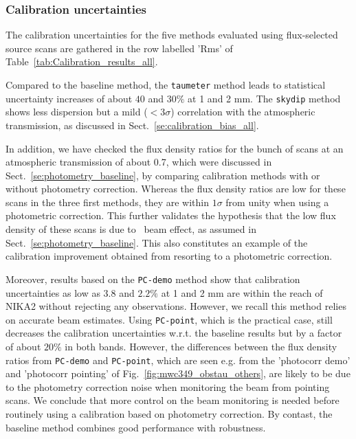 \subsubsection{Calibration uncertainties}

The calibration uncertainties for the five methods evaluated using
flux-selected source scans are gathered in the row labelled 'Rms'
of Table~\ref{tab:Calibration_results_all}.

Compared to the baseline method, the {\tt taumeter} method leads to 
statistical uncertainty increases of about $40$ and $30\%$ at 1 and 2
mm. The {\tt skydip} method shows less dispersion but a mild
($<3\sigma$) correlation with the atmospheric transmission, as
discussed in Sect.~\ref{se:calibration_bias_all}.

In addition, we have checked the flux density ratios for the bunch of
scans at an atmospheric transmission of about 0.7, which were
discussed in Sect.~\ref{se:photometry_baseline}, by comparing
calibration methods with or without photometry correction. Whereas the
flux density ratios are low for these scans in the three first
methods, they are within $1\sigma$ from unity when using a photometric
correction. This further validates the hypothesis that the low flux
density of these scans is due to \afternoon\ beam effect, as assumed in
Sect.~\ref{se:photometry_baseline}. This also constitutes an example
of the calibration improvement obtained from resorting to a
photometric correction.

Moreover, results based on the {\tt PC-demo} method show that calibration
uncertainties as low as $3.8$ and $2.2\%$
at 1 and 2 mm are within the reach of NIKA2 without rejecting any
observations. However, we recall this method relies on 
accurate beam estimates. Using {\tt PC-point}, which is the
practical case, still decreases the calibration uncertainties
w.r.t. the baseline results but by a factor of about $20\%$ in both
bands. However, the differences between
the flux density ratios from {\tt PC-demo} and {\tt PC-point}, which are
seen e.g. from the 'photocorr demo' and 'photocorr pointing' of
Fig.~\ref{fig:mwc349_obstau_others}, are likely
to be due to the photometry correction noise
when monitoring the beam from pointing scans. We conclude that more
control on the beam monitoring is needed before routinely using a calibration
based on photometry correction. By contast, the baseline method
combines good performance with robustness.


